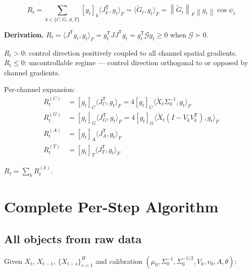 \documentclass[11pt,a4paper]{article}
\theoremstyle{definition}
\newcommand{\T}{^{\mathsf{T}}}
\newcommand{\norm}[1]{\left\|#1\right\|}
\begin{document}
\begin{lockedbox}
\[
R_t = \sum_{k\in\{C,G,A,T\}} [g_t]_k\langle J_k\T, g_t\rangle_F
= \langle\tilde G_t, g_t\rangle_F = \norm{\tilde G_t}_F\norm{g_t}\cos\psi_t
\]
\end{lockedbox}

\textbf{Derivation.}
$R_t = \langle J\T g_t, g_t\rangle_F = g_t\T J J\T g_t = g_t\T\mathcal{G}g_t \geq 0$
when $\mathcal{G} \succ 0$.

$R_t > 0$: control direction positively coupled to all channel spatial gradients.
$R_t \leq 0$: uncontrollable regime — control direction orthogonal to or opposed by channel gradients.

Per-channel expansion:
\begin{align*}
R_t^{(C)} &= [g_t]_C\langle J_C\T, g_t\rangle_F = 4[g_t]_C\langle\tilde X_t\Sigma_0^{-1}, g_t\rangle_F \\
R_t^{(G)} &= [g_t]_G\langle J_G\T, g_t\rangle_F = 4[g_t]_G\langle\tilde X_t(I-V_kV_k\T), g_t\rangle_F \\
R_t^{(A)} &= [g_t]_A\langle J_A\T, g_t\rangle_F \\
R_t^{(T)} &= [g_t]_T\langle J_T\T, g_t\rangle_F
\end{align*}

$R_t = \sum_k R_t^{(k)}$.

\section{Complete Per-Step Algorithm}

\subsection{All objects from raw data}

Given $X_t$, $X_{t-1}$, $\{X_{t-s}\}_{s=1}^H$ and calibration
$(\mu_0, \Sigma_0^{-1}, \Sigma_0^{-1/2}, V_k, v_0, A, \theta)$:
\end{document}

